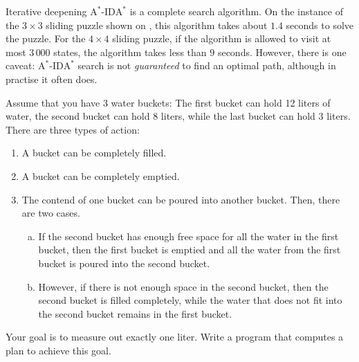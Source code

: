 Iterative deepening $\mathrm{A}^*$-$\mathrm{IDA}^*$ is a complete search algorithm. 
On the instance of the $3 \times 3$ sliding puzzle shown on , this
algorithm takes about $1.4$ seconds to solve the puzzle.  For the $4 \times 4$ sliding puzzle, if the algorithm
is allowed to visit at most $3\,000$ states, the algorithm takes less than $9$ seconds.  However, there is one
caveat: $\mathrm{A}^*$-$\mathrm{IDA}^*$ search is not \emph{guaranteed} to find an optimal path, although in practise it often does. 
\pagebreak

\exercise
Assume that you have 3 water buckets:  The first bucket can hold 12 liters of water, the second bucket can hold 8 liters,
while the last bucket can hold 3 liters.  There are three types of action:
\begin{enumerate}
\item A bucket can be completely filled.
\item A bucket can be completely emptied.
\item The contend of one bucket can be poured into another bucket.  Then, there are two cases.
      \begin{enumerate}[(a)]
      \item If the second bucket has enough free space for all the water in the first bucket, 
            then the first bucket is emptied and all the water from the first bucket is poured 
            into the second bucket.  
      \item However, if there is not enough space in the second bucket, then the second bucket is filled
            completely, while the water that does not fit into the second bucket remains in the first bucket.  
      \end{enumerate}
\end{enumerate}
Your goal is to measure out exactly one liter.  Write a program that computes a plan to achieve this goal.
\eox



